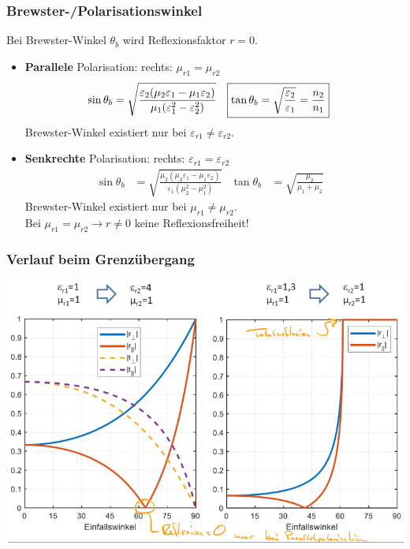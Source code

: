 \subsubsection[Brewster-/Polarisationswinkel]{Brewster-/Polarisationswinkel}
Bei Brewster-Winkel $ \theta_b $ wird Reflexionsfaktor $r=0$.
\begin{itemize}
	\item \textbf{Parallele} Polarisation: \quad rechts:
	$ \mu_{r1}=\mu_{r2} $
	\begin{align*}
		\sin\theta_b & = \sqrt{\frac{\varepsilon_2(\mu_2\varepsilon_1 - \mu_1\varepsilon_2)}{\mu_1(\varepsilon_1^2-\varepsilon_2^2)}} &
		\Aboxed{\tan\theta_b & = \sqrt{\frac{\varepsilon_2}{\varepsilon_1}} = \frac{n_2}{n_1}}&
	\end{align*}
		Brewster-Winkel existiert nur bei $ \varepsilon_{r1} \neq \varepsilon_{r2} $.
    \item \textbf{Senkrechte} Polarisation:  \quad rechts: $ \varepsilon_{r1} = \varepsilon_{r2} $
	\begin{align*}
		\sin\theta_b & = \sqrt{\frac{\mu_2(\mu_2\varepsilon_1 - \mu_1\varepsilon_2)}{\varepsilon_1(\mu_2^2-\mu_1^2)}}&
		\tan\theta_b & = \sqrt{\frac{\mu_2}{\mu_1+\mu_2}}&
	\end{align*}
	Brewster-Winkel existiert nur bei $ \mu_{r1} \neq \mu_{r2} $.\\
	Bei $ \mu_{r1}=\mu_{r2} \rightarrow r \neq 0$ keine Reflexionsfreiheit!
\end{itemize}

\subsubsection{Verlauf beim Grenzübergang}
\includegraphics[width=\columnwidth]{Figures/Totalreflexion_Diagramm.png}

\newpage

